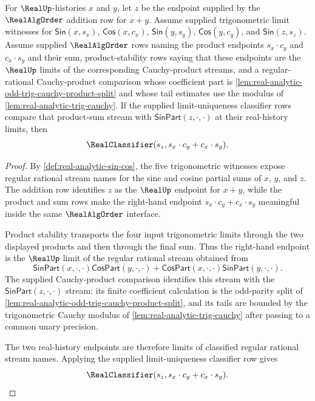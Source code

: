 \begin{theorem}
\label{thm:real-analytic-sin-add}
For $\RealUp$-histories $x$ and $y$, let $z$ be the endpoint supplied by the $\RealAlgOrder$ addition row for $x+y$. Assume supplied trigonometric limit witnesses for $\mathsf{Sin}(x,s_x)$, $\mathsf{Cos}(x,c_x)$, $\mathsf{Sin}(y,s_y)$, $\mathsf{Cos}(y,c_y)$, and $\mathsf{Sin}(z,s_z)$. Assume supplied $\RealAlgOrder$ rows naming the product endpoints $s_x\cdot c_y$ and $c_x\cdot s_y$ and their sum, product-stability rows saying that these endpoints are the $\RealUp$ limits of the corresponding Cauchy-product streams, and a regular-rational Cauchy-product comparison whose coefficient part is \autoref{lem:real-analytic-odd-trig-cauchy-product-split} and whose tail estimates use the modulus of \autoref{lem:real-analytic-trig-cauchy}. If the supplied limit-uniqueness classifier rows compare that product-sum stream with $\mathsf{SinPart}(z,\cdot,\cdot)$ at their real-history limits, then
$$
\RealClassifier(s_z, s_x\cdot c_y + c_x\cdot s_y).
$$
\end{theorem}
\begin{proof}
By \autoref{def:real-analytic-sin-cos}, the five trigonometric witnesses expose regular rational stream names for the sine and cosine partial sums of $x$, $y$, and $z$. The addition row identifies $z$ as the $\RealUp$ endpoint for $x+y$, while the product and sum rows make the right-hand endpoint $s_x\cdot c_y+c_x\cdot s_y$ meaningful inside the same $\RealAlgOrder$ interface.

Product stability transports the four input trigonometric limits through the two displayed products and then through the final sum. Thus the right-hand endpoint is the $\RealUp$ limit of the regular rational stream obtained from
$$
\mathsf{SinPart}(x,\cdot,\cdot)\mathsf{CosPart}(y,\cdot,\cdot)
+
\mathsf{CosPart}(x,\cdot,\cdot)\mathsf{SinPart}(y,\cdot,\cdot).
$$
The supplied Cauchy-product comparison identifies this stream with the $\mathsf{SinPart}(z,\cdot,\cdot)$ stream: its finite coefficient calculation is the odd-parity split of \autoref{lem:real-analytic-odd-trig-cauchy-product-split}, and its tails are bounded by the trigonometric Cauchy modulus of \autoref{lem:real-analytic-trig-cauchy} after passing to a common unary precision.

The two real-history endpoints are therefore limits of classified regular rational stream names. Applying the supplied limit-uniqueness classifier row gives
$$
\RealClassifier(s_z, s_x\cdot c_y + c_x\cdot s_y).
$$
\end{proof}

